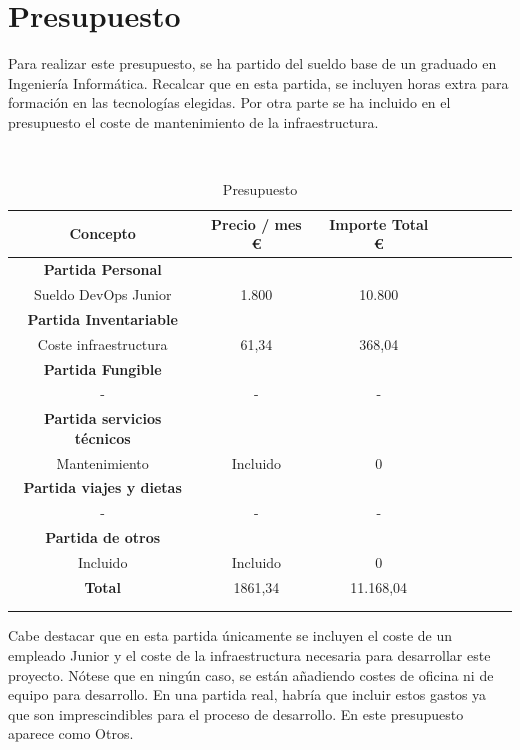 \section{Presupuesto}
	\begin{text}
		Para realizar este presupuesto, se ha partido del sueldo base de un graduado en Ingeniería Informática. Recalcar que en esta partida, se incluyen horas extra para formación en las tecnologías elegidas.
		Por otra parte se ha incluido en el presupuesto el coste de mantenimiento de la infraestructura.
	\end{text}
	\\
	\begin{table}[ht]
		\centering
		\begin{tabular}[!hbt]{SSSSSSSS} \toprule
			{Concepto} &  {Precio / mes \euro} & {Importe Total \euro} \\ \midrule
			{\textbf{Partida Personal}} \\ \midrule
			{Sueldo DevOps Junior}  & {1.800} & {10.800}  \\
		    \midrule
			{\textbf{Partida Inventariable}} \\ \midrule
			{Coste infraestructura}  & {61,34}  & {368,04}   \\
			\midrule
			{\textbf{Partida Fungible}} \\ \midrule
			{-}  & {-}  & {-}   \\
			\midrule
			{\textbf{Partida servicios técnicos}} \\ \midrule
			{Mantenimiento}  & {Incluido}  & {0} \\
			\midrule	
			{\textbf{Partida viajes y dietas}} \\ \midrule
			{-}  & {-}  & {-} \\
			\midrule	
			{\textbf{Partida de otros}} \\ \midrule
			{Incluido}  & {Incluido}  & {0} \\
			\midrule	
			{\textbf{Total}}  & {1861,34}  & {11.168,04} \\
			\\ \midrule
		 \\ \bottomrule
		\end{tabular}
		\caption[Presupuesto]{Presupuesto \cite{presupuesto:online}} 
		\label{Presupuesto}
	\end{table}

	\begin{text}
		Cabe destacar que en esta partida únicamente se incluyen el coste de un empleado Junior y el coste de la infraestructura necesaria para desarrollar este proyecto. Nótese que en ningún caso, se están añadiendo costes de oficina ni de equipo para desarrollo. En una partida real, habría que incluir estos gastos ya que son imprescindibles para el proceso de desarrollo. En este presupuesto aparece como Otros.
	\end{text}
